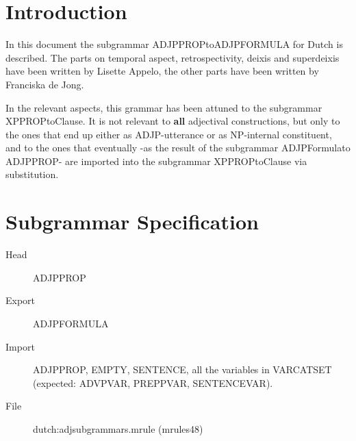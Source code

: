 
   \MakeRosTitle
%
%


\section{Introduction}
In this document the subgrammar ADJPPROPtoADJPFORMULA for Dutch is described.
The parts on temporal aspect, retrospectivity, deixis and superdeixis
have been written by 
Lisette Appelo, the other parts have been written by Franciska de Jong.

In the relevant aspects, this grammar has been attuned to the 
subgrammar XPPROPtoClause. It is not relevant to {\bf all} 
adjectival constructions, but only to the ones that end up  
either as ADJP-utterance or as NP-internal constituent, and to the ones that
eventually -as the result of the subgrammar ADJPFormulato ADJPPROP- are 
imported 
into the subgrammar XPPROPtoClause via substitution.


\section{Subgrammar Specification}

\begin{description}
  \item[Head] ADJPPROP
  \item[Export] ADJPFORMULA
  \item[Import] 
ADJPPROP, EMPTY, SENTENCE, all the
variables in
VARCATSET (expected: ADVPVAR, PREPPVAR, SENTENCEVAR).
  \item[File] dutch:adjsubgrammars.mrule (mrules48)
\end{description}

